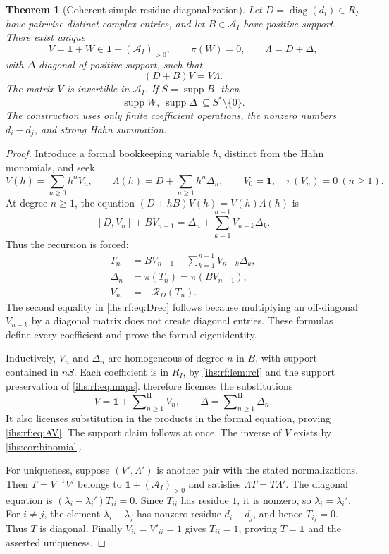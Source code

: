 \documentclass[11pt,a4paper]{article}
\numberwithin{equation}{section}
\newtheorem{theorem}{Theorem}[section]
\theoremstyle{definition}
\theoremstyle{remark}
\newcommand{\Arf}{\mathcal A_I}
\newcommand{\supp}{\operatorname{supp}}
\newcommand{\diag}{\operatorname{diag}}
\newcommand{\Id}{\mathbf 1}
\newcommand{\sH}{\mathop{\sum}\nolimits^{\mathrm H}}
\begin{document}
\begin{theorem}[Coherent simple-residue diagonalization]\label{ihs:rf:thm:similarity}
Let $D=\diag(d_i)\in R_I$ have pairwise distinct complex entries, and let
$B\in\Arf$ have positive support. There exist unique
\[
 V=\Id+W\in\Id+(\Arf)_{>0},\qquad \pi(W)=0,
 \qquad \Lambda=D+\Delta,
\]
with $\Delta$ diagonal of positive support, such that
\begin{equation}\label{ihs:rf:eq:AV}
 (D+B)V=V\Lambda.
\end{equation}
The matrix $V$ is invertible in $\Arf$. If $S=\supp B$, then
\[
 \supp W,\ \supp\Delta\ \subseteq S^*\setminus\{0\}.
\]
The construction uses only finite coefficient operations, the nonzero
numbers $d_i-d_j$, and strong Hahn summation.
\end{theorem}
\begin{proof}
Introduce a formal bookkeeping variable $h$, distinct from the Hahn
monomials, and seek
\[
 V(h)=\sum_{n\ge0}h^nV_n,\qquad
 \Lambda(h)=D+\sum_{n\ge1}h^n\Delta_n,
 \qquad V_0=\Id,\quad \pi(V_n)=0\ (n\ge1).
\]
At degree $n\ge1$, the equation $(D+hB)V(h)=V(h)\Lambda(h)$ is
\[
 [D,V_n]+BV_{n-1}=\Delta_n+\sum_{k=1}^{n-1}V_{n-k}\Delta_k.
\]
Thus the recursion is forced:
\begin{align}
 T_n&=BV_{n-1}-\sum_{k=1}^{n-1}V_{n-k}\Delta_k,\label{ihs:rf:eq:Trec}\\
 \Delta_n&=\pi(T_n)=\pi(BV_{n-1}),\label{ihs:rf:eq:Drec}\\
 V_n&=-\mathcal R_D(T_n).\label{ihs:rf:eq:Vrec}
\end{align}
The second equality in \eqref{ihs:rf:eq:Drec} follows because multiplying an
off-diagonal $V_{n-k}$ by a diagonal matrix does not create diagonal
entries. These formulas define every coefficient and prove the formal
eigenidentity.

Inductively, $V_n$ and $\Delta_n$ are homogeneous of degree $n$ in $B$, with
support contained in $nS$. Each coefficient is in $R_I$, by
\cref{ihs:rf:lem:rcf} and the support preservation of
\eqref{ihs:rf:eq:maps}.  therefore licenses the
substitutions
\[
 V=\Id+\sH_{n\ge1}V_n,\qquad \Delta=\sH_{n\ge1}\Delta_n.
\]
It also licenses substitution in the products in the formal equation,
proving \eqref{ihs:rf:eq:AV}. The support claim follows at once. The inverse
of $V$ exists by \cref{ihs:cor:binomial}.

For uniqueness, suppose $(V',\Lambda')$ is another pair with the stated
normalizations. Then $T=V^{-1}V'$ belongs to $\Id+(\Arf)_{>0}$ and satisfies
$\Lambda T=T\Lambda'$. The diagonal equation is
$(\lambda_i-\lambda_i')T_{ii}=0$. Since $T_{ii}$ has residue $1$, it is
nonzero, so $\lambda_i=\lambda_i'$. For $i\ne j$, the element
$\lambda_i-\lambda_j$ has nonzero residue $d_i-d_j$, and hence $T_{ij}=0$.
Thus $T$ is diagonal. Finally $V_{ii}=V'_{ii}=1$ gives $T_{ii}=1$, proving
$T=\Id$ and the asserted uniqueness.
\end{proof}
\end{document}
